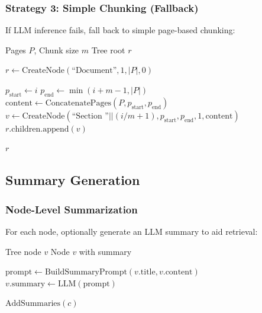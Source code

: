 
\subsubsection{Strategy 3: Simple Chunking (Fallback)}

If LLM inference fails, fall back to simple page-based chunking:

\begin{algorithm}[H]
\caption{Simple Page Chunking}
\begin{algorithmic}[1]
\Require Pages $P$, Chunk size $m$
\Ensure Tree root $r$

\State $r \gets \text{CreateNode}(\text{``Document''}, 1, |P|, 0)$

    \State $p_{\text{start}} \gets i$
    \State $p_{\text{end}} \gets \min(i + m - 1, |P|)$
    \State $\text{content} \gets \text{ConcatenatePages}(P, p_{\text{start}}, p_{\text{end}})$
    \State $v \gets \text{CreateNode}(\text{``Section ''} || (i/m + 1), p_{\text{start}}, p_{\text{end}}, 1, \text{content})$
    \State $r.\text{children.append}(v)$
\EndFor

\State \Return $r$
\end{algorithmic}
\end{algorithm}

\subsection{Summary Generation}

\subsubsection{Node-Level Summarization}

For each node, optionally generate an LLM summary to aid retrieval:

\begin{algorithm}[H]
\caption{Add Summaries to Tree}
\begin{algorithmic}[1]
\Require Tree node $v$
\Ensure Node $v$ with summary

    \State $\text{prompt} \gets \text{BuildSummaryPrompt}(v.\text{title}, v.\text{content})$
    \State $v.\text{summary} \gets \text{LLM}(\text{prompt})$
\EndIf

    \State $\text{AddSummaries}(c)$
\EndFor
\end{algorithmic}
\end{algorithm}

